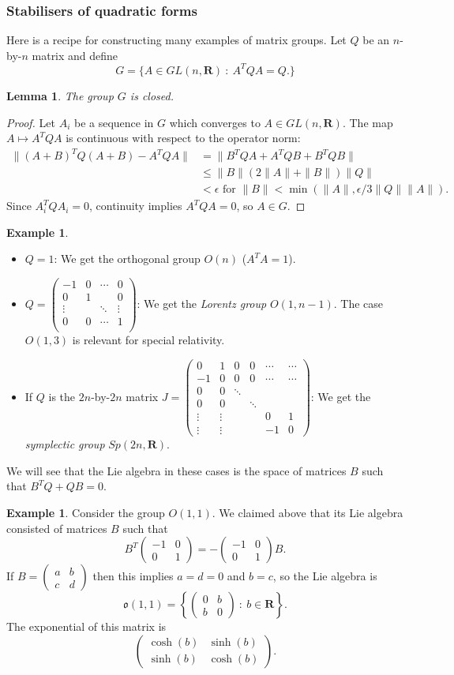 \documentclass[12pt]{article}
\newcommand{\RR}{\mathbf{R}}
\newcommand{\matr}[4]{\left(\begin{array}{cc}#1 & #2\\ #3 & #4\end{array}\right)}
\newcommand{\MATR}[9]{\left(\begin{array}{cccc}#1 & #2 & \cdots & #3\\ #4 & #5 &  & #6\\ \vdots & &\ddots &\vdots\\ #7 & #8 & \cdots & #9\\\end{array}\right)}
\newtheorem{lma}[thm]{Lemma}
\theoremstyle{definition}
\newtheorem{exm}[thm]{Example}
\theoremstyle{check}
\theoremstyle{remark}
\theoremstyle{TheoremNum}
\begin{document}
\subsubsection{Stabilisers of quadratic forms}

Here is a recipe for constructing many examples of matrix groups. Let $Q$ be an $n$-by-$n$ matrix and define
\[G=\{A\in GL(n,\RR)\ :\ A^TQA=Q.\}\]

\begin{lma}
The group $G$ is closed.
\end{lma}
\begin{proof}
Let $A_i$ be a sequence in $G$ which converges to $A\in GL(n,\RR)$. The map $A\mapsto A^TQA$ is continuous with respect to the operator norm:
\begin{align*}
\|(A+B)^TQ(A+B)-A^TQA\|&=\|B^TQA+A^TQB+B^TQB\|\\
                       &\leq \|B\|(2\|A\|+\|B\|)\|Q\|\\
                       &<\epsilon\mbox{ for }\|B\|<\min(\|A\|,\epsilon/3\|Q\|\|A\|).
\end{align*}
Since $A_i^TQA_i=0$, continuity implies $A^TQA=0$, so $A\in G$.
\end{proof}
\begin{exm}
\begin{itemize}
\item $Q=1$: We get the orthogonal group $O(n)$ ($A^TA=1$).
\item $Q=\MATR{-1}{0}{0}{0}{1}{0}{0}{0}{1}$: We get the {\em Lorentz group} $O(1,n-1)$. The case $O(1,3)$ is relevant for special relativity.
\item If $Q$ is the $2n$-by-$2n$ matrix $J=\left(\begin{array}{cccccc}
0 & 1 & 0 & 0 & \cdots & \cdots\\
-1 & 0 & 0 & 0 & \cdots & \cdots\\
0 & 0 & \ddots & & & \\
0 & 0 & & \ddots & & \\
\vdots & \vdots & & & 0 & 1\\
\vdots & \vdots & & & -1 & 0
\end{array}\right)$: We get the {\em symplectic group} $Sp(2n,\RR)$.
\end{itemize}
\end{exm}

We will see that the Lie algebra in these cases is the space of matrices $B$ such that $B^TQ+QB=0$.

\begin{exm}
Consider the group $O(1,1)$. We claimed above that its Lie algebra consisted of matrices $B$ such that
\[B^T\matr{-1}{0}{0}{1}=-\matr{-1}{0}{0}{1}B.\]
If $B=\matr{a}{b}{c}{d}$ then this implies $a=d=0$ and $b=c$, so the Lie algebra is
\[\mathfrak{o}(1,1)=\left\{\matr{0}{b}{b}{0}\ :\ b\in\RR\right\}.\]
The exponential of this matrix is
\[\matr{\cosh(b)}{\sinh(b)}{\sinh(b)}{\cosh(b)}.\]
\end{exm}
\end{document}
